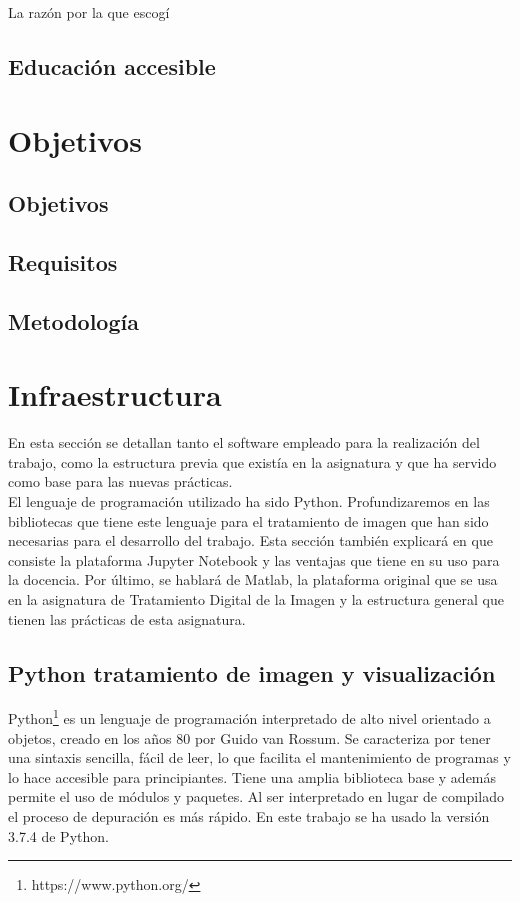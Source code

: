 \documentclass[a4paper,12pt]{report}
\begin{document}
La razón por la que escogí 
\section{Educación accesible}


\chapter{Objetivos}

\section{Objetivos}

\section{Requisitos}

\section{Metodología}


\chapter{Infraestructura}

En esta sección se detallan tanto el software empleado para la realización del trabajo, como la estructura previa que existía en la asignatura y que ha servido como base para las nuevas prácticas. \\

 El lenguaje de programación utilizado ha sido Python. Profundizaremos en las bibliotecas que tiene este lenguaje para el tratamiento de imagen que han sido necesarias para el desarrollo del trabajo. Esta sección también explicará en que consiste la plataforma Jupyter Notebook y las ventajas que tiene en su uso para la docencia. Por último, se hablará de Matlab, la plataforma original que se usa en la asignatura de Tratamiento Digital de la Imagen y la estructura general que tienen las prácticas de esta asignatura.

\section{Python tratamiento de imagen y visualización}

Python\footnote{https://www.python.org/} es un lenguaje de programación interpretado de alto nivel orientado a objetos, creado en los años 80 por Guido van Rossum. Se caracteriza por tener una sintaxis sencilla, fácil de leer, lo que facilita el mantenimiento de programas y lo hace accesible para principiantes. Tiene una amplia biblioteca base y además permite el uso de módulos y paquetes. Al ser interpretado en lugar de compilado el proceso de depuración es más rápido. En este trabajo se ha usado la versión 3.7.4 de Python.\\
\end{document}
